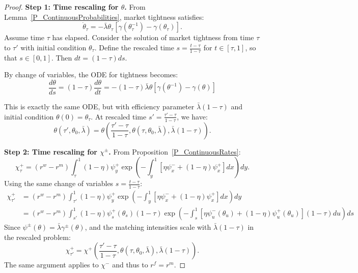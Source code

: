 \begin{proof}
\textbf{Step 1: Time rescaling for $\theta$.} From Lemma~\ref{P_ContinuousProbabilities}, market tightness satisfies:
\[
\dot{\theta}_{\tau} = -\bar{\lambda}\theta_{\tau}[\gamma(\theta_{\tau}^{-1}) - \gamma(\theta_{\tau})].
\]
Assume time $\tau$ has elapsed. Consider the solution of market tightness from time $\tau$ to $\tau'$ with initial condition $\theta_{\tau}$. Define the rescaled time $s = \frac{t - \tau}{1 - \tau}$ for $t \in [\tau, 1]$, so that $s \in [0, 1]$. Then $dt = (1-\tau)ds$.

By change of variables, the ODE for tightness becomes:
\[
\frac{d\theta}{ds} = (1-\tau)\frac{d\theta}{dt} = -(1-\tau)\bar{\lambda}\theta[\gamma(\theta^{-1}) - \gamma(\theta)]
\]

This is exactly the same ODE, but with efficiency parameter $\bar{\lambda}(1-\tau)$ and initial condition $\theta(0) = \theta_{\tau}$. At rescaled time $s' = \frac{\tau' - \tau}{1 - \tau}$, we have:
\[
\theta(\tau', \theta_0, \bar{\lambda}) = \theta\left(\frac{\tau' - \tau}{1 - \tau}, \theta(\tau, \theta_0, \bar{\lambda}), \bar{\lambda}(1-\tau)\right).
\]

\textbf{Step 2: Time rescaling for $\chi^{\pm}$.} From Proposition~\ref{P_ContinuousRates}:
\[
\chi_{\tau}^{+} = (r^{w} - r^{m})\int_{\tau}^{1}(1-\eta)\psi_{y}^{+}\exp\left(-\int_{y}^{1}[\eta\psi_{x}^{-} + (1-\eta)\psi_{x}^{+}]dx\right)dy.
\]
{\color{red}Using the same change of variables $s = \frac{t - \tau}{1 - \tau}$}:
\begin{align*}
\chi_{\tau'}^{+} &= (r^{w} - r^{m})\int_{\tau'}^{1}(1-\eta)\psi_{y}^{+}\exp\left(-\int_{y}^{1}[\eta\psi_{x}^{-} + (1-\eta)\psi_{x}^{+}]dx\right)dy\\
&= (r^{w} - r^{m})\int_{s'}^{1}(1-\eta)\psi_{s}^{+}(\theta_s)(1-\tau)\exp\left(-\int_{s}^{1}[\eta\psi_{u}^{-}(\theta_u) + (1-\eta)\psi_{u}^{+}(\theta_u)](1-\tau)du\right)ds
\end{align*}
Since $\psi^{\pm}(\theta) = \bar{\lambda}\gamma^{\pm}(\theta)$, and the matching intensities scale with $\bar{\lambda}(1-\tau)$ in the rescaled problem:
\[
\chi_{\tau'}^{+} = \chi^{+}\left(\frac{\tau' - \tau}{1 - \tau}, \theta(\tau, \theta_0, \bar{\lambda}), \bar{\lambda}(1-\tau)\right).
\]
The same argument applies to $\chi^{-}$ and thus to $r^{f} = r^{m}$.
\end{proof}